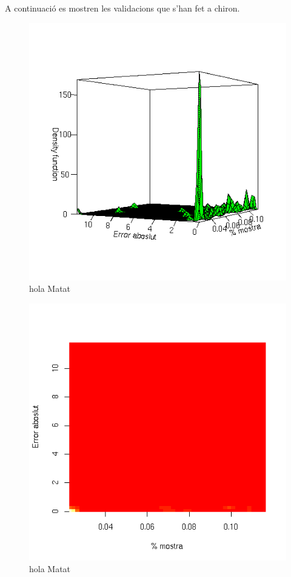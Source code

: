 \documentclass[titlepage,a4paper,12pt]{book}
\begin{document}

	A continuació es mostren les validacions que s'han fet a chiron.  


	\begin{figure}[tbp]
		\begin{center}
			\includegraphics[scale=0.75]{chiron/rgrau1.png}
		\end{center}
		\caption{hola Matat}
		\label{fig:resChir1}
	\end{figure}

	\begin{figure}[tbp]
		\begin{center}
			\includegraphics[scale=0.75]{chiron/rgrau2.png}
		\end{center}
		\caption{hola Matat}
		\label{fig:resChir2}
	\end{figure}
\end{document}
